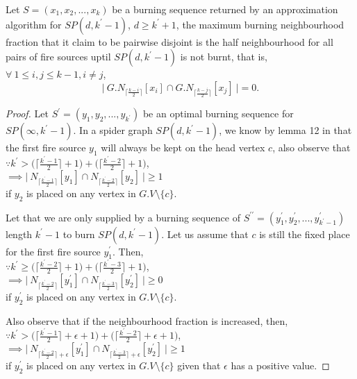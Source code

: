 \begin{lemma}\label{lemma:half-neighbourhood-limit-SP}
Let $S = (x_1, x_2, . . ., x_k)$ be a burning sequence returned by an approximation algorithm for $SP(d,k^{\prime}-1)$, $d \geq k^{\prime}+1$, the maximum burning neighbourhood fraction that it claim to be pairwise disjoint is the half neighbourhood for all pairs of fire sources uptil $SP(d,k^{\prime}-1)$ is not burnt, that is,  $\forall\ 1 \leq i, j \leq k-1, i \neq j$,\\
$$\Big |\ G.N_{\big\lceil\frac{k-i}{2}\big\rceil}[x_i] \cap G.N_{\big\lceil\frac{k-j}{2}\big\rceil}[x_j]\ \Big | = 0.$$
\end{lemma}

\begin{proof}
Let $S^{\prime} = (y_1, y_2, . . ., y_{k^{\prime}})$ be an optimal burning sequence for $SP(\infty, k^{\prime}-1)$. In a spider graph $SP(d, k^{\prime}-1)$, we know by lemma 12 in \cite{Bessy2017} that the first fire source $y_1$ will always be kept on the head vertex $c$, also observe that\\
$\because k^{\prime} > \big (\big\lceil\frac{k^{\prime}-1}{2}\big\rceil + 1 \big ) + \big (\big\lceil\frac{k^{\prime}-2}{2}\big\rceil + 1 \big )$,\\
$\implies \Big |\ N_{\big\lceil\frac{k^{\prime}-1}{2}\big\rceil}[y_1] \cap N_{\big\lceil\frac{k^{\prime}-2}{2}\big\rceil}[y_2]\ \Big | \geq 1$\\
if $y_2$ is placed on any vertex in $G.V \setminus \{c\}$.

Let that we are only supplied by a burning sequence of $S^{\prime\prime} = (y_1^{\prime}, y_2^{\prime}, . . ., y_{k^{\prime}-1}^{\prime})$ length $k^{\prime}-1$ to burn $SP(d, k^{\prime}-1)$. Let us assume that $c$ is still the fixed place for the first fire source $y_1^{\prime}$. Then,\\
$\because k^{\prime} \geq \big (\big\lceil\frac{k^{\prime}-2}{2}\big\rceil + 1 \big ) + \big (\big\lceil\frac{k^{\prime}-3}{2}\big\rceil + 1 \big )$,\\
$\implies \Big |\ N_{\big\lceil\frac{k^{\prime}-2}{2}\big\rceil}[y_1^{\prime}] \cap N_{\big\lceil\frac{k^{\prime}-3}{2}\big\rceil}[y_2^{\prime}]\ \Big | \geq 0$\\
if $y_2^{\prime}$ is placed on any vertex in $G.V \setminus \{c\}$.

Also observe that if the neighbourhood fraction is increased, then,\\
$\because k^{\prime} > \big (\big\lceil\frac{k^{\prime}-1}{2}\big\rceil + \epsilon + 1 \big ) + \big (\big\lceil\frac{k^{\prime}-2}{2}\big\rceil + \epsilon + 1\big )$,\\
$\implies \Big |\ N_{\big\lceil\frac{k^{\prime}-2}{2} \big\rceil + \epsilon}[y_1^{\prime}] \cap N_{\big\lceil\frac{k^{\prime}-3}{2} \big\rceil + \epsilon}[y_2^{\prime}]\ \Big | \geq 1$\\
if $y_2^{\prime}$ is placed on any vertex in $G.V \setminus \{c\}$ given that $\epsilon$ has a positive value.


\end{proof}
